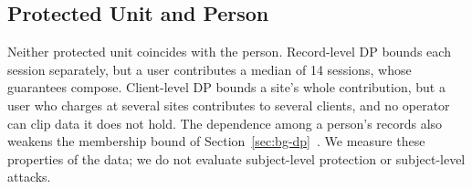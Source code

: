 \subsection{Protected Unit and Person}
\label{sec:threat-unit}

Neither protected unit coincides with the person. Record-level DP bounds each
session separately, but a user contributes a median of 14 sessions, whose
guarantees compose. Client-level DP bounds a site's whole contribution, but a
user who charges at several sites contributes to several clients, and no
operator can clip data it does not hold. The dependence among a person's
records also weakens the membership bound of
Section~\ref{sec:bg-dp}~\cite{humphries2020differentially}. We measure these
properties of the data; we do not evaluate subject-level protection or
subject-level attacks.

